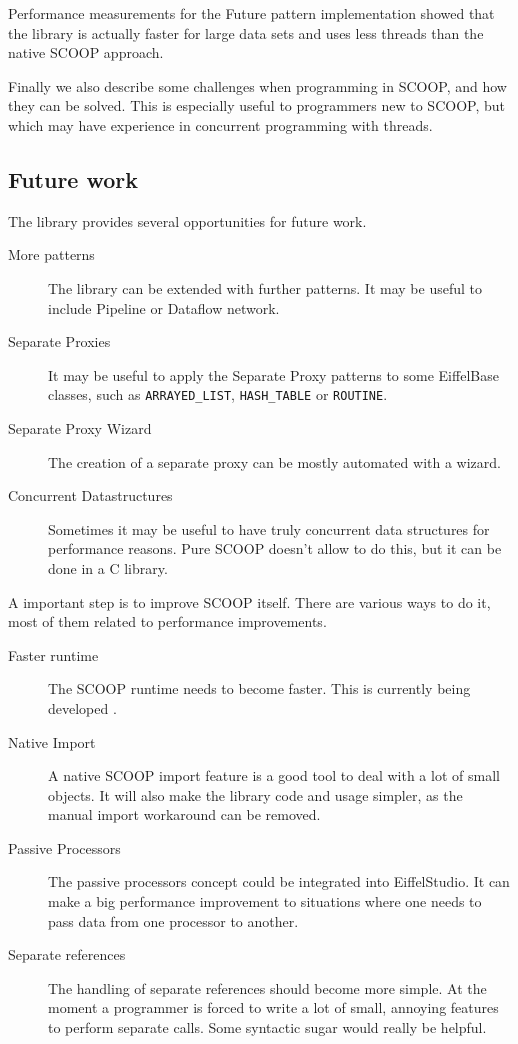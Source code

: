 \documentclass[a4paper,10pt]{article}
\newcommand{\todoref}{\todo{ref}}
\begin{document}
Performance measurements for the Future pattern implementation showed that the library is actually faster for large data sets and uses less threads than the native SCOOP approach.

Finally we also describe some challenges when programming in SCOOP, and how they can be solved.
This is especially useful to programmers new to SCOOP, but which may have experience in concurrent programming with threads.

\subsection{Future work}

The library provides several opportunities for future work.

\begin{description}
 \item [More patterns] The library can be extended with further patterns.
 It may be useful to include Pipeline or Dataflow network.
 \item [Separate Proxies] It may be useful to apply the Separate Proxy patterns to some EiffelBase classes, such as \lstinline!ARRAYED_LIST!, \lstinline!HASH_TABLE! or \lstinline!ROUTINE!.
 \item [Separate Proxy Wizard] The creation of a separate proxy can be mostly automated with a wizard.
 \item [Concurrent Datastructures] Sometimes it may be useful to have truly concurrent data structures for performance reasons.
 Pure SCOOP doesn't allow to do this, but it can be done in a C library.
\end{description}

A important step is to improve SCOOP itself.
There are various ways to do it, most of them related to performance improvements.

\begin{description}
 \item [Faster runtime] The SCOOP runtime needs to become faster. 
 This is currently being developed \todoref.
 \item [Native Import] A native SCOOP import feature is a good tool to deal with a lot of small objects.
 It will also make the library code and usage simpler, as the manual import workaround can be removed.
 \item [Passive Processors] The passive processors concept could be integrated into EiffelStudio.
 It can make a big performance improvement to situations where one needs to pass data from one processor to another.
 \item [Separate references] The handling of separate references should become more simple.
 At the moment a programmer is forced to write a lot of small, annoying features to perform separate calls.
 Some syntactic sugar would really be helpful.
\end{description}
\end{document}
